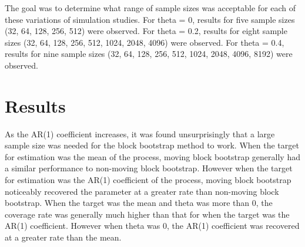 \documentclass[12pt, letterpaper, titlepage]{article}
\begin{document}
The goal was to determine what range of sample sizes was acceptable for each of these variations of simulation studies. For theta = 0, results for five sample sizes (32, 64, 128, 256, 512) were observed. For theta = 0.2, results for eight sample sizes (32,  64, 128, 256, 512, 1024, 2048, 4096) were observed. For theta = 0.4, results for nine sample sizes (32, 64, 128, 256, 512, 1024, 2048, 4096, 8192) were observed.



 

\section{Results}
\label{sec:results}

As the AR(1) coefficient increases, it was found unsurprisingly that a large sample size was needed for the block bootstrap method to work. When the target for estimation was the mean of the process, moving block bootstrap generally had a similar performance to non-moving block bootstrap. However when the target for estimation was the AR(1) coefficient of the process, moving block bootstrap noticeably recovered the parameter at a greater rate than non-moving block bootstrap. When the target was the mean and theta was more than 0, the coverage rate was generally much higher than that for when the target was the AR(1) coefficient. However when theta was 0, the AR(1) coefficient was recovered at a greater rate than the mean. 
\end{document}
